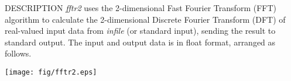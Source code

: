 % 
% 
% 
% 
%                                                                        
%

\begin{synopsis}
\item[fftr2] [ --l $L$ ] [ --m $M_1 \; M_2$ ] [ --t ] [ --c ] [ --q ] 
	     [ --\{ A $|$ R $|$ I $|$ P \} ] [ {\em infile} ] 
\end{synopsis}

\begin{qsection}{DESCRIPTION}
{\em fftr2} uses the 2-dimensional Fast Fourier Transform (FFT) algorithm 
to calculate the 2-dimensional Discrete Fourier Transform (DFT) 
of real-valued input data from {\em infile} (or standard input), 
sending the result to standard output. 
The input and output data is in float format, arranged as follows.
\begin{center}
 \leavevmode
 \texttt{[image: fig/fftr2.eps]}
\end{center}
\end{qsection}

